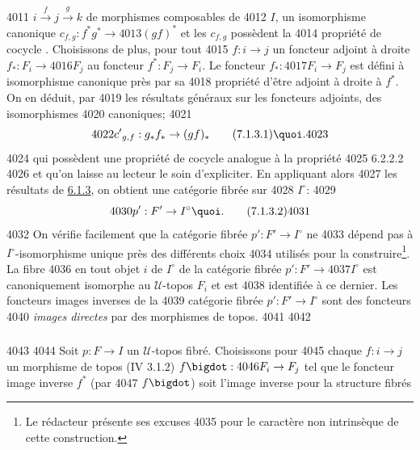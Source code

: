   4011	$i \xrightarrow{f} j \xrightarrow{g} k$ de morphismes composables de
  4012	$I$, un isomorphisme canonique $c_{f, g} : f^{\ast} g^{\ast} \to
  4013	(gf)^{\ast}$   et les $c_{f, g}$ possèdent la
  4014	propriété de cocycle . Choisissons de plus, pour tout
  4015	$f : i \to j$ un foncteur adjoint à droite $f_{\ast} : F_{i} \to
  4016	F_j$ au foncteur $f^{\ast} : F_j \to F_i$. Le foncteur $f_{\ast} :
  4017	F_i \to F_j$ est défini à isomorphisme canonique près par sa
  4018	propriété d'être adjoint à droite à $f^{\ast}$. On en déduit, par
  4019	les résultats généraux sur les foncteurs adjoints, des isomorphismes
  4020	canoniques;
  4021	\begin{equation*}
  4022	{c'}_{g, f} : g_{\ast} f_{\ast} \to (gf)_{\ast}\tag{7.1.3.1}{\quoi}.
  4023	\end{equation*}
  4024	qui possèdent une propriété de cocycle analogue à la propriété
  4025	6.2.2.2
  4026	et qu'on laisse au lecteur le soin d'expliciter. En appliquant alors
  4027	les résultats de \hyperref[VI.subsubsec6.1.3]{6.1.3}, on obtient une catégorie fibrée sur
  4028	$I^{\circ}$:
  4029	\begin{equation*}
  4030	p': F'\to I^{\circ}{\quoi}.\tag{7.1.3.2}
  4031	\end{equation*}
  4032	On vérifie facilement que la catégorie fibrée $p': F'\to I^{\circ}$ ne
  4033	dépend pas à $I^{\circ}$-isomorphisme unique près des différents choix
  4034	utilisés pour la construire\footnote{Le rédacteur présente ses excuses
  4035	  pour le caractère non intrinsèque de cette construction.}. La fibre
  4036	en tout objet $i$ de $I^{\circ}$ de la catégorie fibrée $p': F'\to
  4037	I^{\circ}$ est canoniquement isomorphe au $𝒰$-topos $F_i$ et est
  4038	identifiée à ce dernier. Les foncteurs images inverses de la
  4039	catégorie fibrée $p': F'\to I^{\circ}$ sont des foncteurs
  4040	\emph{images directes} par des morphismes de topos.
  4041	
  4042	\subsubsection{}
  4043	
  4044	Soit $p : F \to I$ un $𝒰$-topos fibré. Choisissons pour
  4045	chaque $f : i \to j$ un morphisme de topos (IV 3.1.2) $f\bigdot :
  4046	F_i \to F_j$ tel que le foncteur image inverse $f^{\ast}$ (par
  4047	$f\bigdot$) soit l'image inverse pour la structure fibrés
